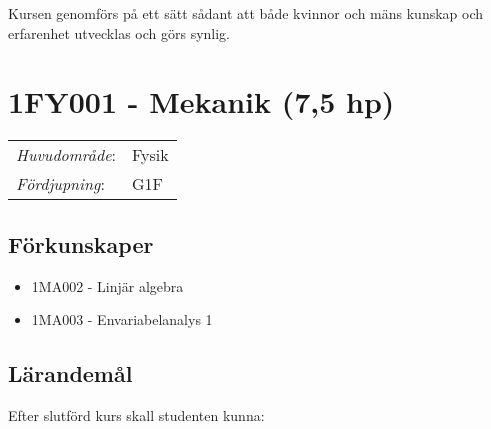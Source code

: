 Kursen genomförs på ett sätt sådant att både kvinnor och mäns kunskap och erfarenhet utvecklas och görs synlig.
\pagebreak
\section*{1FY001 - Mekanik (7,5 hp)}

\begin{tabular}{ll}\emph{Huvudområde}: & Fysik\tabularnewline\emph{Fördjupning}: & G1F\tabularnewline\end{tabular}

\subsection*{Förkunskaper}

\begin{itemize}
\tightlist
\item
  1MA002 - Linjär algebra
\item
  1MA003 - Envariabelanalys 1
\end{itemize}

\subsection*{Lärandemål}

Efter slutförd kurs skall studenten kunna:

